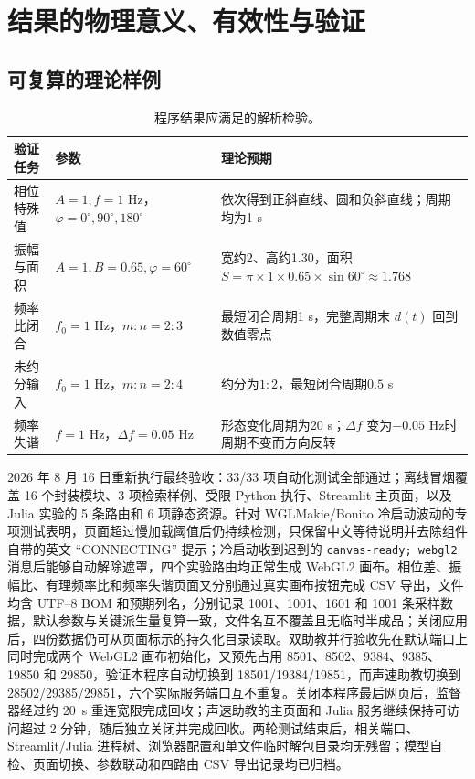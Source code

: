 \documentclass[UTF8,a4paper,zihao=-4]{ctexart}
\begin{document}
\section{结果的物理意义、有效性与验证}

\subsection{可复算的理论样例}
\begin{table}[!htb]
\centering
\begin{tabularx}{\textwidth}{p{3.1cm}p{4.1cm}X}
\toprule
验证任务 & 参数 & 理论预期\\
\midrule
相位特殊值 & $A=1, f=1$ Hz，$\varphi=0^\circ,90^\circ,180^\circ$ & 依次得到正斜直线、圆和负斜直线；周期均为1 s\\
振幅与面积 & $A=1,B=0.65,\varphi=60^\circ$ & 宽约2、高约1.30，面积 $S=\pi\times1\times0.65\times\sin60^\circ\approx1.768$\\
频率比闭合 & $f_0=1$ Hz，$m:n=2:3$ & 最短闭合周期1 s，完整周期末 $d(t)$ 回到数值零点\\
未约分输入 & $f_0=1$ Hz，$m:n=2:4$ & 约分为$1:2$，最短闭合周期$0.5$ s\\
频率失谐 & $f=1$ Hz，$\Delta f=0.05$ Hz & 形态变化周期为20 s；$\Delta f$ 变为$-0.05$ Hz时周期不变而方向反转\\
\bottomrule
\end{tabularx}
\caption{程序结果应满足的解析检验。}
\end{table}

2026 年 8 月 16 日重新执行最终验收：33/33 项自动化测试全部通过；离线冒烟覆盖 16 个封装模块、3 项检索样例、受限 Python 执行、Streamlit 主页面，以及 Julia 实验的 5 条路由和 6 项静态资源。针对 WGLMakie/Bonito 冷启动波动的专项测试表明，页面超过慢加载阈值后仍持续检测，只保留中文等待说明并去除组件自带的英文 ``CONNECTING'' 提示；冷启动收到迟到的 \texttt{canvas-ready; webgl2} 消息后能够自动解除遮罩，四个实验路由均正常生成 WebGL2 画布。相位差、振幅比、有理频率比和频率失谐页面又分别通过真实画布按钮完成 CSV 导出，文件均含 UTF--8 BOM 和预期列名，分别记录 1001、1001、1601 和 1001 条采样数据，默认参数与关键派生量复算一致，文件名互不覆盖且无临时半成品；关闭应用后，四份数据仍可从页面标示的持久化目录读取。双助教并行验收先在默认端口上同时完成两个 WebGL2 画布初始化，又预先占用 8501、8502、9384、9385、19850 和 29850，验证本程序自动切换到 18501/19384/19851，而声速助教切换到 28502/29385/29851，六个实际服务端口互不重复。关闭本程序最后网页后，监督器经过约 20~s 重连宽限完成回收；声速助教的主页面和 Julia 服务继续保持可访问超过 2 分钟，随后独立关闭并完成回收。两轮测试结束后，相关端口、Streamlit/Julia 进程树、浏览器配置和单文件临时解包目录均无残留；模型自检、页面切换、参数联动和四路由 CSV 导出记录均已归档。
\end{document}
